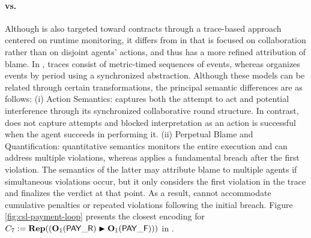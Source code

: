 \paragraph{\cDL vs. } Although  is also targeted toward contracts through a trace-based approach centered on runtime monitoring, it differs from \cDL in that \cDL is focused on collaboration rather than on disjoint agents' actions, and thus has a more refined attribution of blame. In , traces consist of metric-timed sequences of events, whereas \cDL organizes events by period using a synchronized abstraction. Although these models can be related through certain transformations, the principal semantic differences are as follows:
(i) Action Semantics: \cDL captures both the attempt to act and potential interference through its synchronized collaborative round structure. In contrast,  does not capture attempts and blocked interpretation as an action is successful when the agent succeeds in performing it.
(ii) Perpetual Blame and Quantification: \cDL quantitative semantics monitors the entire execution and can address multiple violations, whereas  applies a fundamental breach after the first violation. The semantics of the latter may attribute blame to multiple agents if simultaneous violations occur, but it only considers the first violation in the trace and finalizes the verdict at that point. As a result,  cannot accommodate cumulative penalties or repeated violations following the initial breach. Figure \ref{fig:csl-payment-loop} presents the closest encoding for $C_7 := \repit{(\obl[1]{\PAY} \repair \obl[1]{\PAYF})}$ in .
